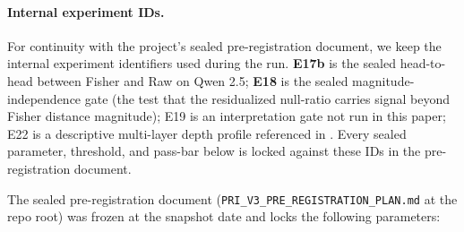 \documentclass[10pt, letterpaper]{article}
\begin{document}
\paragraph{Internal experiment IDs.} For continuity with the project's
sealed pre-registration document, we keep the internal experiment
identifiers used during the run. \textbf{E17b} is the sealed
head-to-head between Fisher and Raw on Qwen 2.5; \textbf{E18} is the
sealed magnitude-independence gate (the test that the residualized
null-ratio carries signal beyond Fisher distance magnitude); E19 is an
interpretation gate not run in this paper; E22 is a descriptive
multi-layer depth profile referenced in . Every
sealed parameter, threshold, and pass-bar below is locked against
these IDs in the pre-registration document.

The sealed pre-registration document
(\texttt{PRI\_V3\_PRE\_REGISTRATION\_PLAN.md} at the repo root) was
frozen at the snapshot date and locks the following parameters:
\end{document}

